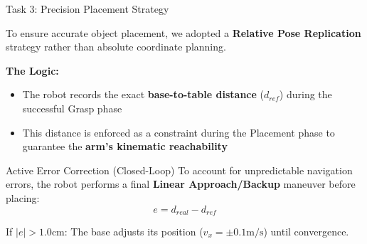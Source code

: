 \begin{frame}{Task 3: Precision Placement Strategy}

    To ensure accurate object placement, we adopted a \textbf{Relative Pose Replication} strategy rather than absolute coordinate planning.
    
    \vspace{0.3cm}

    \textbf{The Logic:}
    \begin{itemize}
        \item The robot records the exact \textbf{base-to-table distance} ($d_{ref}$) during the successful Grasp phase
        \item This distance is enforced as a constraint during the Placement phase to guarantee the \textbf{arm's kinematic reachability}
    \end{itemize}


    \vspace{0.1cm}

    \begin{block}{Active Error Correction (Closed-Loop)}
        To account for unpredictable navigation errors, the robot performs a final \textbf{Linear Approach/Backup} maneuver before placing: $$e = d_{real} - d_{ref}$$
        
        If $|e| > 1.0\text{cm}$: The base adjusts its position ($v_x = \pm 0.1 \text{m/s}$) until convergence.
    \end{block}

\end{frame}

